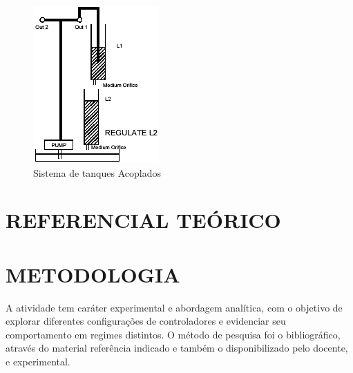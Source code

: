 \documentclass[a4paper,12pt]{article}
\begin{document}
\begin{flushleft}
\begin{flushleft}
\end{flushleft}

\begin{figure}[h]
    \centering
    \includegraphics{images/1_relatorio/config_2.png}
    \caption{Sistema de tanques Acoplados}
    \label{fig:sistema_de_tanques_acoplados}
\end{figure}

 
 

\end{flushleft}

\newpage


\thispagestyle{main}

\section{REFERENCIAL TEÓRICO}


\newpage


\thispagestyle{main}

\section{METODOLOGIA}\hspace{4ex}
A atividade tem caráter experimental e abordagem analítica, com o objetivo de explorar diferentes configurações de controladores e evidenciar seu comportamento em regimes distintos. O método de pesquisa foi o bibliográfico, através do material referência indicado e também o disponibilizado pelo docente, e experimental.
\end{document}
